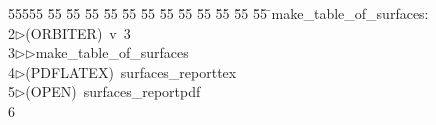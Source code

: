 %
%
\begin{tabbing}
55555 \= 55 \= 55 \= 55 \= 55 \= 55 \= 55 \= 55 \= 55 \= 55 \= 55 \= 55 \= 55 \= \>make\_table\_of\_surfaces:\\[0pt]
2\>$\triangleright$\>(ORBITER)\ v\ 3\ \\[0pt]
3\>$\triangleright$\>$\triangleright$\>make\_table\_of\_surfaces\\[0pt]
4\>$\triangleright$\>(PDFLATEX)\ surfaces\_reporttex\\[0pt]
5\>$\triangleright$\>(OPEN)\ surfaces\_reportpdf\\[0pt]
6\>\end{tabbing}
